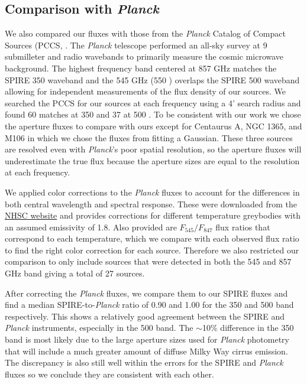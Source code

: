 \subsection{Comparison with \textit{Planck}}
We also compared our fluxes with those from the \textit{Planck} Catalog of Compact Sources (PCCS, \citet{Planck-Collaboration:2013rt}. The \textit{Planck} telescope performed an all-sky survey at 9 submilleter and radio wavebands to primarily measure the cosmic microwave background. The highest frequency band centered at 857 GHz matches the SPIRE 350 \um{} waveband and the 545 GHz (550 \um{}) overlaps the SPIRE 500 \um{} waveband allowing for independent measurements of the flux density of our sources. We searched the PCCS for our sources at each frequency using a 4' search radius and found 60 matches at 350 \um{} and 37 at 500 \um{}. To be consistent with our work we chose the aperture fluxes to compare with ours except for Centaurus A, NGC 1365, and M106 in which we chose the fluxes from fitting a Gaussian. These three sources are resolved even with \textit{Planck}'s poor spatial resolution, so the aperture fluxes will underestimate the true flux because the aperture sizes are equal to the resolution at each frequency. 

We applied color corrections to the \textit{Planck} fluxes to account for the differences in both central wavelength and spectral response. These were downloaded from the \href{https://nhscsci.ipac.caltech.edu/sc/index.php/Spire/PhotDataAnalysis}{NHSC website} and provides corrections for different temperature greybodies with an assumed emissivity of 1.8. Also provided are $F_{545}/F_{847}$ flux ratios that correspond to each temperature, which we compare with each observed flux ratio to find the right color correction for each source. Therefore we also restricted our comparison to only include sources that were detected in both the 545 and 857 GHz band giving a total of 27 sources. 

After correcting the \textit{Planck} fluxes, we compare them to our SPIRE fluxes and find a median SPIRE-to-\textit{Planck} ratio of 0.90 and 1.00 for the 350 and 500 \um{} band respectively. This shows a relatively good agreement between the SPIRE and \textit{Planck} instruments, especially in the 500 \um{} band. The $\sim$10\% difference in the 350 \um{} band is most likely due to the large aperture sizes used for \textit{Planck} photometry that will include a much greater amount of diffuse Milky Way cirrus emission. The discrepancy is also still well within the errors for the SPIRE and \textit{Planck} fluxes so we conclude they are consistent with each other. 
  
